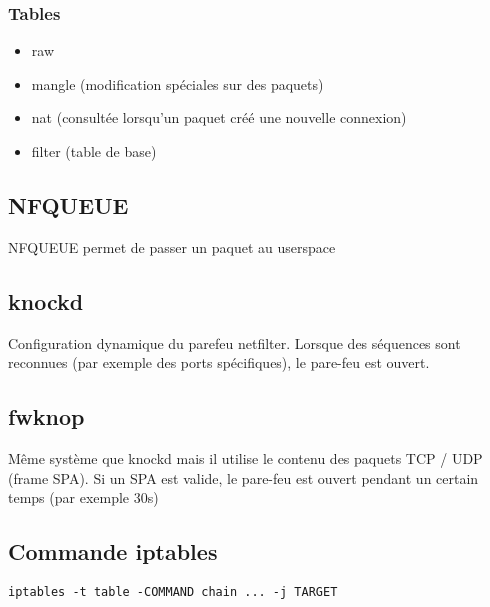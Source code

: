 \subsubsection{Tables}
\begin{itemize}
\item raw
\item mangle (modification spéciales sur des paquets)
\item nat (consultée lorsqu'un paquet créé une nouvelle connexion)
\item filter (table de base)
\end{itemize}

\subsection{NFQUEUE}
NFQUEUE permet de passer un paquet au userspace
\subsection{knockd}
Configuration dynamique du parefeu netfilter. Lorsque des séquences sont reconnues (par exemple des ports spécifiques), le pare-feu est ouvert.
\subsection{fwknop}
Même système que knockd mais il utilise le contenu des paquets TCP / UDP (frame SPA). Si un SPA est valide, le pare-feu est ouvert pendant un certain temps (par exemple 30s)

\subsection{Commande iptables}
\begin{center}
\verb!iptables -t table -COMMAND chain ... -j TARGET!
\end{center}
